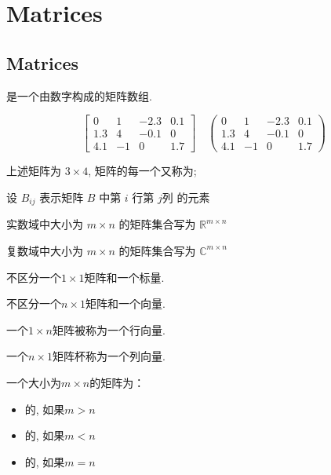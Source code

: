 \chapter{Matrices}

\section{Matrices}

\begin{definition}[矩阵]
    是一个由数字构成的矩阵数组. 

    $$ \left[\begin{array}{cccc}0 & 1 & -2.3 & 0.1 \\ 1.3 & 4 & -0.1 & 0 \\ 4.1 & -1 & 0 & 1.7\end{array}\right] \quad  \left(\begin{array}{cccc}0 & 1 & -2.3 & 0.1 \\ 1.3 & 4 & -0.1 & 0 \\ 4.1 & -1 & 0 & 1.7\end{array}\right)  $$

    上述矩阵为 $3\times 4$, 矩阵的每一个又称为;
\end{definition}

\begin{notation}
    设 $ B_{i j} $ 表示矩阵 $ B $ 中第 $ i $ 行第 $ j $列 的元素

    实数域中大小为 $ m \times n $ 的矩阵集合写为 $ \mathbb{R}^{m \times n} $

    复数域中大小为 $ m \times n $ 的矩阵集合写为 $ \mathbb{C}^{m \times n} $
\end{notation}

\begin{definition}[标量]
    不区分一个$1\times 1$矩阵和一个标量. 
\end{definition}

\begin{definition}[向量]
    不区分一个$n\times 1$矩阵和一个向量. 
\end{definition}

\begin{definition}
    一个$1\times n$矩阵被称为一个行向量. 
    
    一个$n\times 1$矩阵杯称为一个列向量. 
\end{definition}

\begin{definition}[高形, 宽形和方形矩阵]
    一个大小为$m\times n$的矩阵为：
    \begin{itemize}
        \item {}的, 如果$m>n$
        \item {}的, 如果$m<n$
        \item {}的, 如果$m=n$
    \end{itemize}
\end{definition}


